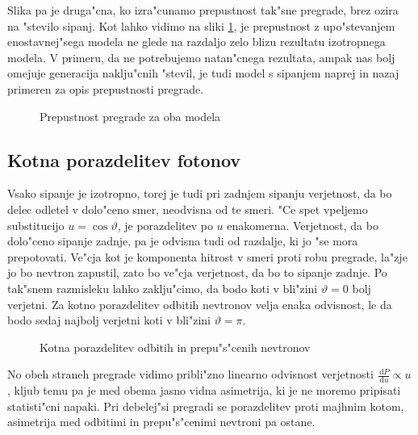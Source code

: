 \documentclass[a4paper,10pt]{article}
\renewcommand{\theta}{\vartheta}
\newcommand{\dd}{\,\mathrm{d}}
\begin{document}
Slika pa je druga"cna, ko izra"cunamo prepustnost tak"sne pregrade, brez ozira na "stevilo sipanj. Kot lahko vidimo na sliki \ref{fig:ref-prepustnost}, je prepustnost z upo"stevanjem enostavnej"sega modela ne glede na razdaljo zelo blizu rezultatu izotropnega modela. V primeru, da ne potrebujemo natan"cnega rezultata, ampak nas bolj omejuje generacija naklju"cnih "stevil, je tudi model s sipanjem naprej in nazaj primeren za opis prepustnosti pregrade. 

\begin{figure}[h!]

\caption{Prepustnost pregrade za oba modela} 
\label{fig:ref-prepustnost}
\end{figure}


\subsection{Kotna porazdelitev fotonov}

Vsako sipanje je izotropno, torej je tudi pri zadnjem sipanju verjetnost, da bo delec odletel v dolo"ceno smer, neodvisna od te smeri. "Ce spet vpeljemo substitucijo $u=\cos\theta$, je porazdelitev po $u$ enakomerna. Verjetnost, da bo dolo"ceno sipanje zadnje, pa je odvisna tudi od razdalje, ki jo "se mora prepotovati. Ve"cja kot je komponenta hitrost v smeri proti robu pregrade, la"zje jo bo nevtron zapustil, zato bo ve"cja verjetnost, da bo to sipanje zadnje. Po tak"snem razmisleku lahko zaklju"cimo, da bodo koti v bli"zini $\theta=0$ bolj verjetni. Za kotno porazdelitev odbitih nevtronov velja enaka odvisnost, le da bodo sedaj najbolj verjetni koti v bli"zini $\theta=\pi$. 

\begin{figure}[h!]
 
\caption{Kotna porazdelitev odbitih in prepu"s"cenih nevtronov}
\label{fig:ref-kot}
\end{figure}

No obeh straneh pregrade vidimo pribli"zno linearno odvisnost verjetnosti $\frac{\dd P}{\dd u} \propto u$, kljub temu pa je med obema jasno vidna asimetrija, ki je ne moremo pripisati statisti"cni napaki. Pri debelej"si pregradi se porazdelitev proti majhnim kotom, asimetrija med odbitimi in prepu"s"cenimi nevtroni pa ostane. 
\end{document}
